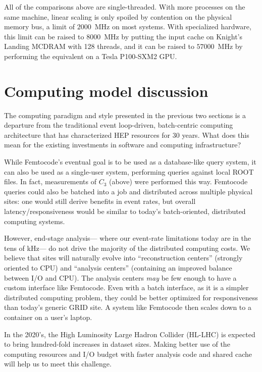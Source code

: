 \documentclass{article}
\begin{document}
All of the comparisons above are single-threaded. With more processes on the same machine, linear scaling is only spoiled by contention on the physical memory bus, a limit of $2000$~MHz on most systems. With specialized hardware\footnotemark, this limit can be raised to $8000$~MHz by putting the input cache on Knight's Landing MCDRAM with 128 threads, and it can be raised to $57000$~MHz by performing the equivalent on a Tesla P100-SXM2 GPU.


\section{Computing model discussion}

The computing paradigm and style presented in the previous two sections is a departure from the traditional event loop-driven, batch-centric computing architecture that has characterized HEP resources for 30 years.  What does this mean for the existing investments in software and computing infrastructure?

While Femtocode's eventual goal is to be used as a database-like query system, it can also be used as a single-user system, performing queries against local ROOT files. In fact, measurements of $C_3$ (above) were performed this way. Femtocode queries could also be batched into a job and distributed across multiple physical sites: one would still derive benefits in event rates, but overall latency/responsiveness would be similar to today's batch-oriented, distributed computing systems.

However, end-stage analysis--- where our event-rate limitations today are in the tens of kHz--- do not drive the majority of the distributed computing costs.  We believe that sites will naturally evolve into ``reconstruction centers'' (strongly oriented to CPU) and ``analysis centers'' (containing an improved balance between I/O and CPU)\footnotemark.  The analysis centers {\it may} be few enough to have a custom interface like Femtocode.  Even with a batch interface, as it is a simpler distributed computing problem, they could be better optimized for responsiveness than today's generic GRID site.  A system like Femtocode then scales down to a container on a user's laptop.


In the 2020's, the High Luminosity Large Hadron Collider (HL-LHC) is expected to bring hundred-fold increases in dataset sizes. Making better use of the computing resources and I/O budget with faster analysis code and shared cache will help us to meet this challenge.
\end{document}
